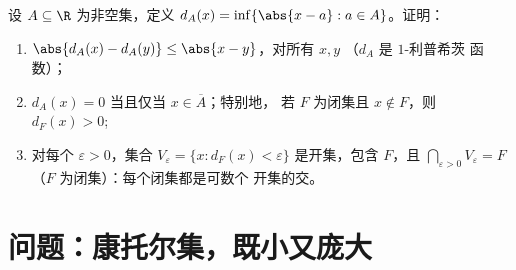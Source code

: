 \begin{exercise}[$\star\star\star$]\label{exo:b1:topology:12}
设 $A \subseteq \R$ 为非空集，定义 $d_A(x) = \inf\{\abs{x - a}
: a \in A\}$。证明：
\begin{enumerate}
  \item $\abs{d_A(x) - d_A(y)} \leq \abs{x - y}$，对所有 $x, y$
        （$d_A$ 是 $1$-利普希茨 函数）；
  \item $d_A(x) = 0$ 当且仅当 $x \in \overline A$；特别地，
        若 $F$ 为闭集且 $x \notin F$，则
        $d_F(x) > 0$;
  \item 对每个 $\varepsilon > 0$，集合 $V_\varepsilon =
        \{x : d_F(x) < \varepsilon\}$ 是开集，包含 $F$，且
        $\bigcap_{\varepsilon > 0} V_\varepsilon = F$（$F$
        为闭集）：每个闭集都是可数个
        开集的交。
\end{enumerate}
\end{exercise}

\section{问题：康托尔集，既小又庞大}

